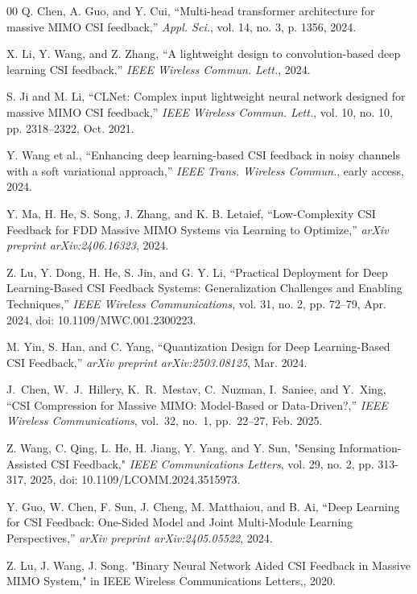 \documentclass[lettersize,journal]{IEEEtran}
\begin{document}
\begin{thebibliography}{00}
	Q. Chen, A. Guo, and Y. Cui, ``Multi-head transformer architecture for massive MIMO CSI feedback,'' \textit{Appl. Sci.}, vol. 14, no. 3, p. 1356, 2024.
	
	X. Li, Y. Wang, and Z. Zhang, ``A lightweight design to convolution-based deep learning CSI feedback,'' \textit{IEEE Wireless Commun. Lett.}, 2024.
	
	S. Ji and M. Li, ``CLNet: Complex input lightweight neural network designed for massive MIMO CSI feedback,'' \textit{IEEE Wireless Commun. Lett.}, vol. 10, no. 10, pp. 2318--2322, Oct. 2021.
	
	Y. Wang et al., ``Enhancing deep learning-based CSI feedback in noisy channels with a soft variational approach,'' \textit{IEEE Trans. Wireless Commun.}, early access, 2024.
	
	Y. Ma, H. He, S. Song, J. Zhang, and K. B. Letaief, ``Low-Complexity CSI Feedback for FDD Massive MIMO Systems via Learning to Optimize,'' \textit{arXiv preprint arXiv:2406.16323}, 2024.
	
	Z. Lu, Y. Dong, H. He, S. Jin, and G. Y. Li, ``Practical Deployment for Deep Learning-Based CSI Feedback Systems: Generalization Challenges and Enabling Techniques,'' \textit{IEEE Wireless Communications}, vol. 31, no. 2, pp. 72--79, Apr. 2024, doi: 10.1109/MWC.001.2300223.
	
	M. Yin, S. Han, and C. Yang, ``Quantization Design for Deep Learning-Based CSI Feedback,'' \textit{arXiv preprint arXiv:2503.08125}, Mar. 2024.
	
	J.~Chen, W.~J.~Hillery, K.~R.~Mestav, C.~Nuzman, I.~Saniee, and Y.~Xing, ``CSI Compression for Massive MIMO: Model-Based or Data-Driven?,'' \emph{IEEE Wireless Communications}, vol.~32, no.~1, pp.~22--27, Feb. 2025.
	
	Z. Wang, C. Qing, L. He, H. Jiang, Y. Yang, and Y. Sun,
	"Sensing Information-Assisted CSI Feedback,"
	\textit{IEEE Communications Letters},
	vol. 29, no. 2, pp. 313-317, 2025,
	doi: 10.1109/LCOMM.2024.3515973.
	
	
	Y. Guo, W. Chen, F. Sun, J. Cheng, M. Matthaiou, and B. Ai, ``Deep Learning for CSI Feedback: One-Sided Model and Joint Multi-Module Learning Perspectives,'' \textit{arXiv preprint arXiv:2405.05522}, 2024.

    Z. Lu, J. Wang, J. Song. "Binary Neural Network Aided CSI Feedback in Massive MIMO System," in IEEE Wireless Communications Letters,, 2020.


\end{thebibliography}
\end{document}
